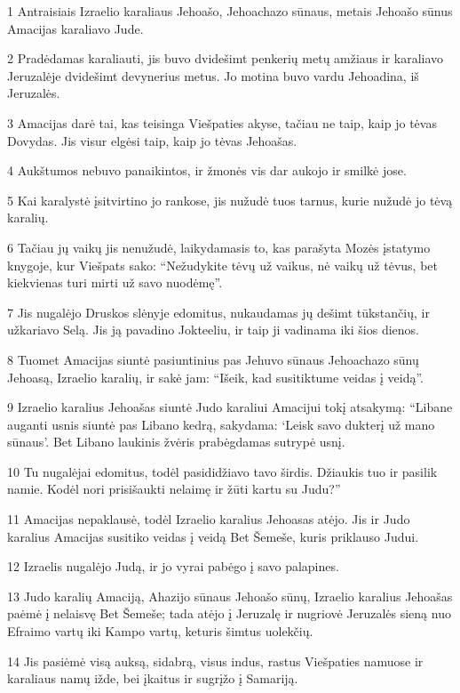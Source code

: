\par 1 Antraisiais Izraelio karaliaus Jehoašo, Jehoachazo sūnaus, metais Jehoašo sūnus Amacijas karaliavo Jude. 
\par 2 Pradėdamas karaliauti, jis buvo dvidešimt penkerių metų amžiaus ir karaliavo Jeruzalėje dvidešimt devynerius metus. Jo motina buvo vardu Jehoadina, iš Jeruzalės. 
\par 3 Amacijas darė tai, kas teisinga Viešpaties akyse, tačiau ne taip, kaip jo tėvas Dovydas. Jis visur elgėsi taip, kaip jo tėvas Jehoašas. 
\par 4 Aukštumos nebuvo panaikintos, ir žmonės vis dar aukojo ir smilkė jose. 
\par 5 Kai karalystė įsitvirtino jo rankose, jis nužudė tuos tarnus, kurie nužudė jo tėvą karalių. 
\par 6 Tačiau jų vaikų jis nenužudė, laikydamasis to, kas parašyta Mozės įstatymo knygoje, kur Viešpats sako: “Nežudykite tėvų už vaikus, nė vaikų už tėvus, bet kiekvienas turi mirti už savo nuodėmę”. 
\par 7 Jis nugalėjo Druskos slėnyje edomitus, nukaudamas jų dešimt tūkstančių, ir užkariavo Selą. Jis ją pavadino Jokteeliu, ir taip ji vadinama iki šios dienos. 
\par 8 Tuomet Amacijas siuntė pasiuntinius pas Jehuvo sūnaus Jehoachazo sūnų Jehoasą, Izraelio karalių, ir sakė jam: “Išeik, kad susitiktume veidas į veidą”. 
\par 9 Izraelio karalius Jehoašas siuntė Judo karaliui Amacijui tokį atsakymą: “Libane auganti usnis siuntė pas Libano kedrą, sakydama: ‘Leisk savo dukterį už mano sūnaus’. Bet Libano laukinis žvėris prabėgdamas sutrypė usnį. 
\par 10 Tu nugalėjai edomitus, todėl pasididžiavo tavo širdis. Džiaukis tuo ir pasilik namie. Kodėl nori prisišaukti nelaimę ir žūti kartu su Judu?” 
\par 11 Amacijas nepaklausė, todėl Izraelio karalius Jehoasas atėjo. Jis ir Judo karalius Amacijas susitiko veidas į veidą Bet Šemeše, kuris priklauso Judui. 
\par 12 Izraelis nugalėjo Judą, ir jo vyrai pabėgo į savo palapines. 
\par 13 Judo karalių Amaciją, Ahazijo sūnaus Jehoašo sūnų, Izraelio karalius Jehoašas paėmė į nelaisvę Bet Šemeše; tada atėjo į Jeruzalę ir nugriovė Jeruzalės sieną nuo Efraimo vartų iki Kampo vartų, keturis šimtus uolekčių. 
\par 14 Jis pasiėmė visą auksą, sidabrą, visus indus, rastus Viešpaties namuose ir karaliaus namų ižde, bei įkaitus ir sugrįžo į Samariją. 
